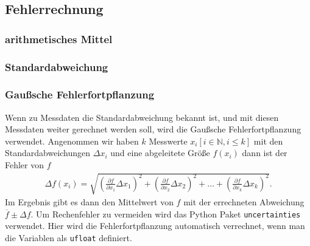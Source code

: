 \subsection{Fehlerrechnung}

\subsubsection{arithmetisches Mittel}


\subsubsection{Standardabweichung}


\subsubsection{Gaußsche Fehlerfortpflanzung}

Wenn zu Messdaten die Standardabweichung bekannt ist, und mit diesen Messdaten weiter gerechnet werden soll,
wird die Gaußsche Fehlerfortpflanzung verwendet. 
Angenommen wir haben $k$ Messwerte $x_i [i \in \mathbb{N}, i \leq k]$ mit den Standardabweichungen $\Delta x_i$
und eine abgeleitete Größe $f(x_i)$ dann ist der Fehler von $f$
\begin{align}
    \Delta f(x_i) = \sqrt{
    \left(\frac{\partial f}{\partial x_1} \Delta x_1\right)^2%
     + \left(\frac{\partial f}{\partial x_2} \Delta x_2\right)^2%
     + \dots%
     + \left(\frac{\partial f}{\partial x_k} \Delta x_k\right)^2%
    }.
    \label{eq:gauspflanz}
\end{align} 
Im Ergebnis gibt es dann den Mittelwert von $f$ mit der errechneten Abweichung $\overline{f} \pm \Delta f $.
Um Rechenfehler zu vermeiden wird das Python Paket \texttt{uncertainties} \cite[][]{uncertainties} verwendet.
Hier wird die Fehlerfortpflanzung automatisch verrechnet, wenn man die Variablen als \texttt{ufloat} definiert.


